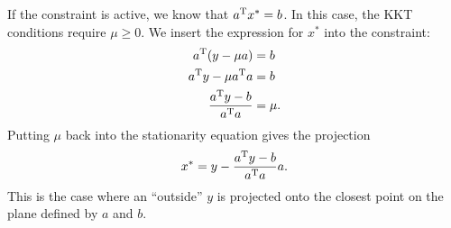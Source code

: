 \documentclass{article}
\begin{document}
If the constraint is active, we know that \(a^{\mathrm{T}}x^* = b\).  In this case, the KKT conditions
require \(\mu \geq 0\).  We insert the expression for \(x^*\) into the constraint:
\begin{align*}
  a^{\mathrm{T}}(y - \mu a) &= b \\
  a^{\mathrm{T}} y - \mu a^{\mathrm{T}} a &= b \\
  \frac{a^{\mathrm{T}}y - b}{a^{\mathrm{T}} a} &= \mu.
\end{align*}
Putting \(\mu\) back into the stationarity equation gives the projection
\begin{equation*}
  x^* = y - \frac{a^{\mathrm{T}}y - b}{a^{\mathrm{T}} a} a.
\end{equation*}
This is the case where an ``outside'' \(y\) is projected onto the closest point on the plane defined by \(a\) and
\(b\).




\end{document}
